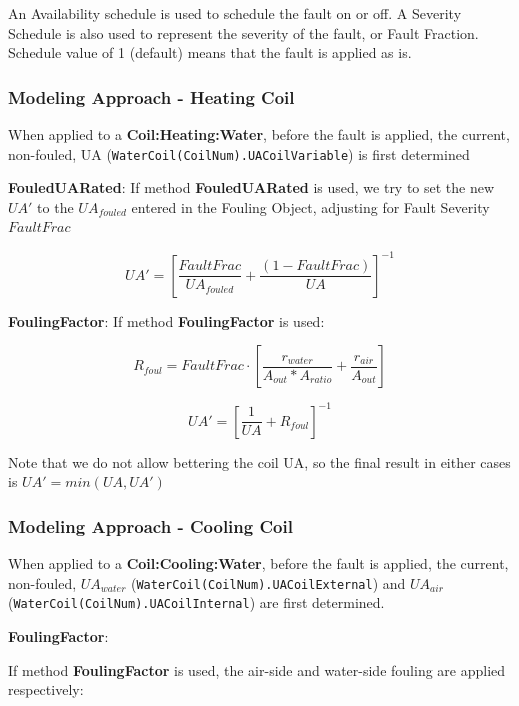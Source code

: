 An Availability schedule is used to schedule the fault on or off.
A Severity Schedule is also used to represent the severity of the fault, or Fault Fraction. Schedule value of 1 (default) means that the fault is applied as is.

\subsubsection{Modeling Approach - Heating Coil}\label{modeling-approach-fouling-coil-heating}

When applied to a \textbf{Coil:Heating:Water}, before the fault is applied, the current, non-fouled, UA (\lstinline!WaterCoil(CoilNum).UACoilVariable!) is first determined

\textbf{FouledUARated}:
If method \textbf{FouledUARated} is used, we try to set the new $UA'$ to the $UA_{fouled}$ entered in the Fouling Object, adjusting for Fault Severity $FaultFrac$

\begin{equation}
    UA' = [\frac{FaultFrac}{UA_{fouled}}+\frac{(1-FaultFrac)}{UA}]^{-1}
\end{equation}

\textbf{FoulingFactor}:
If method \textbf{FoulingFactor} is used:

\begin{equation}
    R_{foul} = FaultFrac \cdot [ \frac{r_{water}}{A_{out}*A_{ratio}} + \frac{r_{air}}{A_{out}} ]
\end{equation}

\begin{equation}
    UA' = [\frac{1}{UA} + R_{foul}]^{-1}
\end{equation}

Note that we do not allow bettering the coil UA, so the final result in either cases is $UA' = min(UA, UA')$


\subsubsection{Modeling Approach - Cooling Coil}\label{modeling-approach-fouling-coil-cooling}

When applied to a \textbf{Coil:Cooling:Water}, before the fault is applied, the current, non-fouled, $UA_{water}$ (\lstinline!WaterCoil(CoilNum).UACoilExternal!) and 
$UA_{air}$ (\lstinline!WaterCoil(CoilNum).UACoilInternal!) are first determined.

\textbf{FoulingFactor}:

If method \textbf{FoulingFactor} is used, the air-side and water-side fouling are applied respectively:

